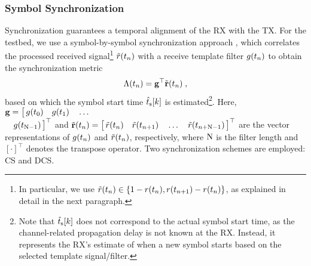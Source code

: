 \subsubsection{Symbol Synchronization}
\scaleSubsubsectionBelow
Synchronization guarantees a temporal alignment of the \ac{RX} with the \ac{TX}. For the testbed, we use a symbol-by-symbol synchronization approach \cite{jamali2017symbol}, which correlates the processed received signal\footnote{In particular, we use $\Tilde{r}(t_n) \in \{1 - r(t_n), r(t_{n+1}) - r(t_n)\}$, as explained in detail in the next paragraph.} $\Tilde{r}(t_n)$ with a receive template filter $g(t_n)$ to obtain the synchronization metric
\begin{equation}
  \Lambda (t_n) = \mathbf{g}^\top \Tilde{\mathbf{r}} (t_n) \;,
\label{sync_metric}
\end{equation}
based on which the symbol start time $\hat{t}_\mathrm{s}[k]$ is estimated\footnote{Note that $\hat{t}_\mathrm{s}[k]$ does not correspond to the actual symbol start time, as the channel-related propagation delay is not known at the \ac{RX}. Instead, it represents the \ac{RX}'s estimate of when a new symbol starts based on the selected template signal/filter.}.
Here, $\mathbf{g} = \big[\, g(t_{0}) \quad g(t_{1}) \quad \hdots$\\$ \quad g(t_{\mathrm{N}-1})\,\big]^\top$ and $\Tilde{\mathbf{r}}(t_n) = \big[\,\Tilde{r}(t_n) \quad \Tilde{r}(t_{n+1}) \quad \hdots \quad \Tilde{r}(t_{n+\mathrm{N}-1})\,\big]^\top$ are the vector representations of $g(t_n)$ and $\Tilde{r}(t_n)$, respectively, where $\mathrm{N}$ is the filter length and $[\cdot]^\top$ denotes the transpose operator.
Two synchronization schemes are employed: \Ac{CS} and \ac{DCS}.
